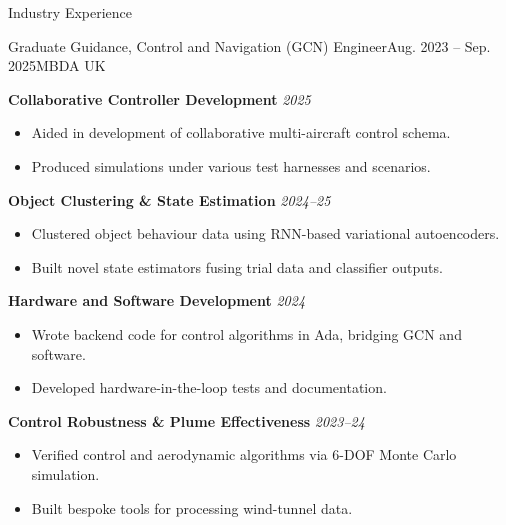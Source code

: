 
\begin{rSection}{Industry Experience}

    \begin{rSubsection}{Graduate Guidance, Control and Navigation (GCN) Engineer}{Aug. 2023 -- Sep. 2025}{MBDA UK}{}
        \item \textbf{Collaborative Controller Development} \hfill \textit{2025}
        \begin{itemize}[leftmargin=1.2em, label=--, topsep=0pt, partopsep=0pt, before={\vspace{-0.5em}}]
            \item Aided in development of collaborative multi-aircraft control schema.
            \item Produced simulations under various test harnesses and scenarios.
        \end{itemize}
        \item \textbf{Object Clustering \& State Estimation} \hfill \textit{2024--25}
        \begin{itemize}[leftmargin=1.2em, label=--, topsep=0pt, partopsep=0pt, before={\vspace{-0.5em}}]
            \item Clustered object behaviour data using RNN-based variational autoencoders.
            \item Built novel state estimators fusing trial data and classifier outputs.
        \end{itemize}
        \item \textbf{Hardware and Software Development} \hfill \textit{2024}
        \begin{itemize}[leftmargin=1.2em, label=--, topsep=0pt, partopsep=0pt, before={\vspace{-0.5em}}]
            \item Wrote backend code for control algorithms in Ada, bridging GCN and software.
            \item Developed hardware-in-the-loop tests and documentation.
        \end{itemize}
        \item \textbf{Control Robustness \& Plume Effectiveness} \hfill \textit{2023--24}
        \begin{itemize}[leftmargin=1.2em, label=--, topsep=0pt, partopsep=0pt, before={\vspace{-0.5em}}]
            \item Verified control and aerodynamic algorithms via 6-DOF Monte Carlo simulation.
            \item Built bespoke tools for processing wind-tunnel data.
        \end{itemize}
    \end{rSubsection}


\end{rSection}
